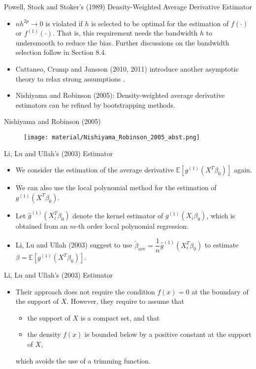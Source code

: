 \documentclass[xcolor=svgnames,dvipdfmx,cjk]{beamer}
\theoremstyle{example}
\def\E{\mathbb{E}}
\begin{document}
\begin{frame}{Powell, Stock and Stoker's (1989) Density-Weighted Average Derivative Estimator}
\begin{itemize}
  \item $nh^{2p} \to 0$ is violated if $h$ is selected to be optimal for the estimation of $f(\cdot)$ or $f^{(1)}(\cdot)$.
        That is, this requirement needs \alert{the bandwidth $h$ to undersmooth to reduce the bias}.
        Further discussions on the bandwidth selection follow in Section 8.4.
  \item Cattaneo, Crump and Jansson (2010, 2011) 
        introduce another asymptotic theory to relax strong assumptions .
  \item Nishiyama and Robinson (2005): Density-weighted average derivative estimators can be refined by bootstrapping methods.
\end{itemize}  
\end{frame}

\begin{frame}{Nishiyama and Robinson (2005)}
  \begin{figure}
    \begin{center}
    \texttt{[image: material/Nishiyama\_Robinson\_2005\_abst.png]}
    \end{center}
  \end{figure}
\end{frame}

\begin{frame}{Li, Lu and Ullah's (2003) Estimator}
\begin{itemize}
  \item We consider the estimation of the average derivative $\E[g^{(1)}(X^T\beta_0)]$ again.
  \item We can also use the local polynomial method for the estimation of $g^{(1)}(X^T\beta_0)$.
  \item Let $\hat{g}^{(1)}(X_i^T\beta_0)$ denote the kernel estimator of $g^{(1)}(X_i\beta_0)$,
        which is obtained from an $m$-th order local polynomial regression.
  \item Li, Lu and Ullah (2003) suggest to use $\tilde{\beta}_{ave} = \dfrac{1}{n}\hat{g}^{(1)}(X_i^T\beta_0)$ 
        to estimate $\beta = \E[{g}^{(1)}(X^T\beta_0)]$.
\end{itemize}
\end{frame}

\begin{frame}{Li, Lu and Ullah's (2003) Estimator}
\begin{itemize}
  \item Their approach does not require the condition $f(x)=0$ at the boundary of the support of $X$. 
        However, they require to assume that 
        \begin{itemize}
          \item the support of $X$ is a compact set, and that 
          \item the density $f(x)$ is bounded below by a positive constant at the support of $X$,
        \end{itemize}
        which avoids the use of a trimming function. 
\end{itemize}  
\end{frame}
\end{document}
